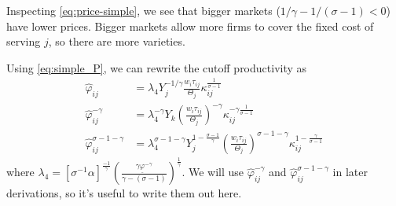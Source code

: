 \documentclass[11pt, pdftex]{article}
\begin{document}
Inspecting \eqref{eq:price-simple}, we see that bigger markets ($1/\gamma-1/(\sigma-1)<0$) have lower prices. Bigger markets allow more firms to cover the fixed cost of serving $j$, so there are more varieties.

Using \eqref{eq:simple_P}, we can rewrite the cutoff productivity as
\begin{align}
  \hat{\varphi}_{ij}&=\lambda_4 Y_j^{-1/\gamma}\frac{w_i\tau_{ij}}{\Theta_j} \kappa_{ij}^{\frac{1}{\sigma-1}}\\
  \hat{\varphi}_{ij}^{-\gamma} & =\lambda_4^{-\gamma} Y_k \left(\frac{w_i\tau_{ij}}{\Theta_j}\right)^{-\gamma}  \kappa_{ij}^{-\gamma\frac{1}{\sigma-1}}\\
  \hat{\varphi}_{ij}^{\sigma-1-\gamma}&=\lambda_4^{\sigma-1-\gamma} Y_j^{1-\frac{\sigma-1}{\gamma}}\left(\frac{w_i\tau_{ij}}{\Theta_j}\right) ^{\sigma-1-\gamma} \kappa_{ij}^{1-\frac{\gamma}{\sigma-1}}
\end{align}
where $
  \lambda_4=[\sigma^{-1}\alpha]^{\frac{-1}{\gamma}}\left(\frac{\gamma\underline{\varphi}^{-\gamma}}{\gamma-(\sigma-1)}\right)^\frac{1}{\gamma}.
$
We will use $\hat{\varphi}_{ij}^{-\gamma}$ and $\hat{\varphi}_{ij}^{\sigma-1-\gamma}$ in later derivations, so it's useful to write them out here.
\end{document}
